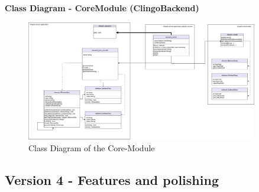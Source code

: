 \documentclass[12pt,a4paper]{article}
\newcommand{\<}[1]{\guilsinglleft}
\renewcommand{\>}[1]{\guilsinglright}
\begin{document}
\newpage

\noindent \textbf{Class Diagram - CoreModule (ClingoBackend)}

\begin{figure}[ht]
    \begin{center}
    \includegraphics[width=0.9\textwidth]{imgs/pt-v3-class-diag-core-module.png}
    \caption{Class Diagram of the Core-Module}
    \label{fig:pt-v3-class-diag-core-module}
    \end{center}
\end{figure}


\newpage
\subsection{Version 4 - Features and polishing}
\end{document}
